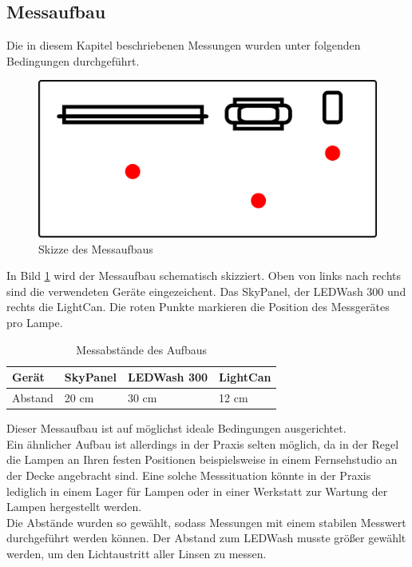 \documentclass[11pt]{scrartcl}
\begin{document}
\subsection{Messaufbau}
Die in diesem Kapitel beschriebenen Messungen wurden unter folgenden Bedingungen durchgeführt.
\begin{figure}[H]
    \begin{center}
        \includegraphics[width=.8\textwidth]{images/meassureScenario.png}
    \end{center}
    \caption{Skizze des Messaufbaus} \label{fig:measureScribble}
\end{figure}
\noindent
In Bild \ref{fig:measureScribble} wird der Messaufbau schematisch skizziert. Oben von links nach rechts sind die verwendeten Geräte eingezeichent.
Das SkyPanel, der LEDWash 300 und rechts die LightCan. Die roten Punkte markieren die Position des Messgerätes pro Lampe.
\begin{table}[H]
    \begin{tabularx}{\textwidth}{|l|X|X|X|}
        \hline Gerät  & SkyPanel & LEDWash 300 & LightCan\\\hline
        Abstand       & 20 cm    & 30 cm       & 12 cm   \\\hline
    \end{tabularx}
    \caption{Messabstände des Aufbaus}
\end{table}
Dieser Messaufbau ist auf möglichst ideale Bedingungen ausgerichtet.\\
Ein ähnlicher Aufbau ist allerdings in der Praxis selten möglich, da in der Regel die Lampen an Ihren festen Positionen beispielsweise in einem
Fernsehstudio an der Decke angebracht sind. Eine solche Messsituation könnte in der Praxis lediglich in einem Lager für Lampen oder in einer
Werkstatt zur Wartung der Lampen hergestellt werden.\\
Die Abstände wurden so gewählt, sodass Messungen mit einem stabilen Messwert durchgeführt werden können. Der Abstand zum LEDWash musste größer
gewählt werden, um den Lichtaustritt aller Linsen zu messen.\\
\end{document}
